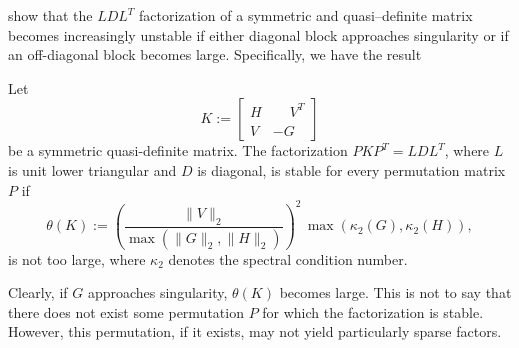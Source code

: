 \documentclass{amsart}
\begin{document}
\cite{gill-saunders-shinnerl-1996} show that the $LDL^T$ factorization of a
symmetric and quasi--definite matrix becomes increasingly unstable if either
diagonal block approaches singularity or if an off-diagonal block becomes
large. Specifically, we have the result
\begin{btheorem}
  \label{thm:gss}
  Let
  \[
    K :=
    \begin{bmatrix}
      H & \phantom{-}V^T \\
      V & -G^{\phantom{T}}
    \end{bmatrix}
  \]
  be a symmetric quasi-definite matrix. The factorization $P K P^T = L D L^T$,
  where $L$ is unit lower triangular and $D$ is diagonal, is stable for every
  permutation matrix $P$ if
  \[
    \theta(K) :=
    \left(
      \frac{\|V\|_2}{\max(\|G\|_2, \|H\|_2)}
    \right)^2
    \,
    \max( \kappa_2(G), \kappa_2(H) ),
  \]
  is not too large, where $\kappa_2$ denotes the spectral condition number.
\end{btheorem}
Clearly, if $G$ approaches singularity, $\theta(K)$ becomes large. This is not
to say that there does not exist some permutation $P$ for which the
factorization is stable. However, this permutation, if it exists, may not yield
particularly sparse factors.
\end{document}
